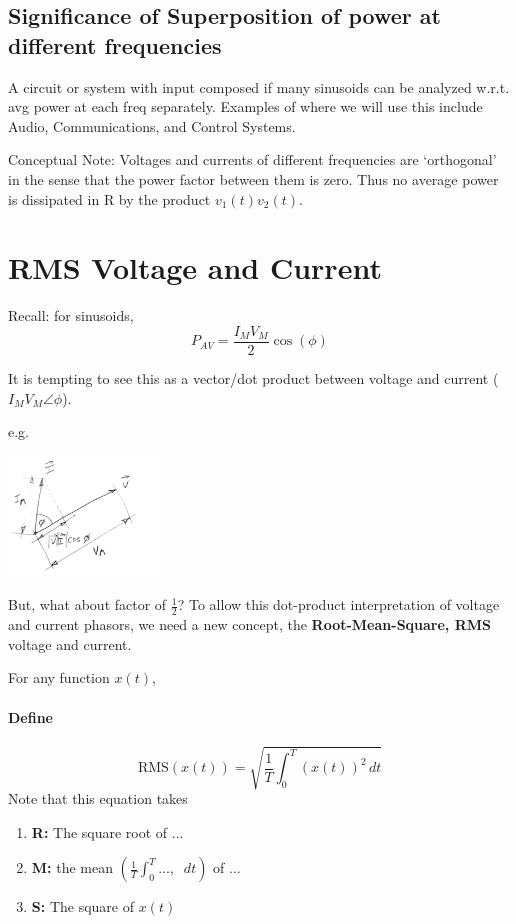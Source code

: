 \subsection*{Significance of Superposition of power at different frequencies}

A circuit or system with input composed if many sinusoids can be analyzed w.r.t. avg power at each freq separately.  Examples of where we will use this include Audio, Communications,
and Control Systems.

 Conceptual Note: Voltages and currents of different frequencies are `orthogonal' in the sense that the power factor between them is zero.
 Thus no average power is dissipated in R by the product $v_1(t) v_2(t)$.

\noindent



\section{RMS Voltage and Current}
Recall: for sinusoids,
\[
P_{AV} = \frac{I_M V_M}{2} \cos(\phi)
\]

It is tempting to see this as a vector/dot product between voltage and current ($I_M V_M\angle \phi
$).

e.g.

\includegraphics[width=0.3\textwidth]{figsChapt03/UH48274.png}

But, what about factor of $\frac{1}{2}$?    To allow this dot-product interpretation of
voltage and current phasors, we need a new concept, the {\bf Root-Mean-Square, RMS} voltage
and current.

For any function $x(t)$,

\paragraph{Define}

\[
\text{RMS}(x(t)) = \sqrt{\frac{1}{T} \int_0^T (x(t))^2 \, dt}
\]
Note that this equation takes
\begin{enumerate}
    \item {\bf R: } The square root of ...
    \item {\bf M: }the mean $\left ( \frac{1}{T} \int_0^T ... ,\;\; dt \right )$ of ...
    \item {\bf S: }The square of $x(t)$
\end{enumerate}

